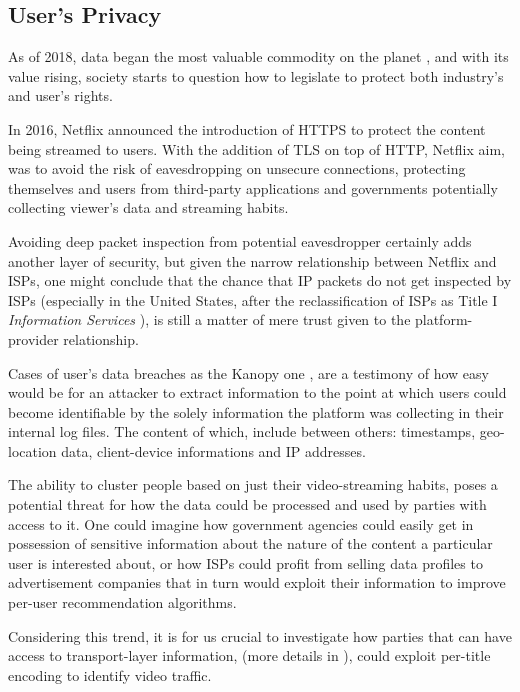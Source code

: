 \subsection{User's Privacy}\label{sec:privacy}

As of 2018, data began the most valuable commodity on the planet
\cite{data-value}, and with its value rising, society starts to question how to
legislate to protect both industry's and user's rights.

In 2016, Netflix announced the introduction of HTTPS to protect the content
being streamed to users. With the addition of TLS on top of HTTP, Netflix aim,
was to avoid the risk of eavesdropping on unsecure connections, protecting
themselves and users from third-party applications and governments potentially
collecting viewer's data and streaming habits.

Avoiding deep packet inspection from potential eavesdropper certainly adds
another layer of security, but given the narrow relationship between Netflix
and ISPs, one might conclude that the chance that IP packets do not get
inspected by ISPs (especially in the United States, after the reclassification
of ISPs as Title I \emph{Information Services} \cite{net-neutrality}), is still
a matter of mere trust given to the platform-provider relationship.

Cases of user's data breaches as the Kanopy one \cite{kanopy}, are a testimony
of how easy would be for an attacker to extract information to the point at
which users could become identifiable by the solely information the platform
was collecting in their internal log files. The content of which, include
between others: timestamps, geo-location data, client-device informations and
IP addresses. 

The ability to cluster people based on just their video-streaming habits, poses
a potential threat for how the data could be processed and used by parties with
access to it. One could imagine how government agencies could easily get in
possession of sensitive information about the nature of the content a
particular user is interested about, or how ISPs could profit from selling data
profiles to advertisement companies that in turn would exploit their
information to improve per-user recommendation algorithms.

Considering this trend, it is for us crucial to investigate how parties that
can have access to transport-layer information, (more details in
), could exploit per-title encoding to identify video
traffic. 

